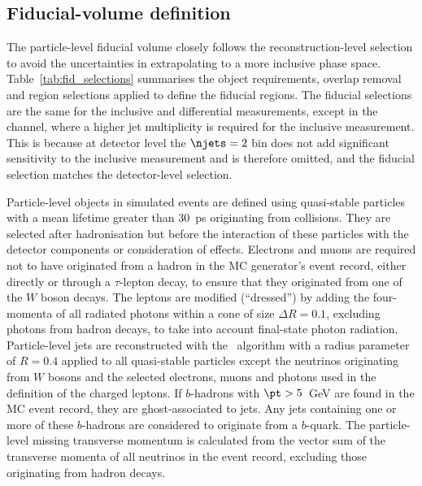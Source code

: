 \documentclass[cernpreprint, atlasdraft=false, texlive=2023, UKenglish, texmf, orcidlogo]{atlasdoc}
\begin{document}
 
 
\subsection{Fiducial-volume definition}
The particle-level fiducial volume closely follows the
reconstruction-level selection to avoid the uncertainties in
extrapolating to a more inclusive phase space. Table~\ref{tab:fid_selections}
summarises the object requirements, overlap removal and region
selections applied to define the fiducial regions. The fiducial selections are
the same for the inclusive and differential \xs measurements, except in the
\llSS channel, where a higher jet multiplicity is required for the inclusive measurement.
This is because at detector level the $\njets=2$ bin does not add
significant sensitivity to the inclusive \xs measurement and is
therefore omitted, and the fiducial selection matches the detector-level selection.
 
Particle-level objects in simulated events are defined using
quasi-stable particles with a mean lifetime greater than 30~ps
originating from \pp collisions. They are selected after
hadronisation but before the interaction of these particles with the
detector components or consideration of \pileup effects.
Electrons and muons are required not to have originated from a hadron in the MC generator's event record, either
directly or through a $\tau$-lepton decay, to ensure that they originated from one of the $W$ boson decays.
The leptons are modified (\enquote{dressed}) by adding the four-momenta of
all radiated photons within a cone of size $\Delta R = 0.1$, excluding
photons from hadron decays, to take into account final-state photon radiation.
Particle-level jets are reconstructed with the \antikt~algorithm with a radius parameter
of $R = 0.4$ applied to all quasi-stable particles except the neutrinos originating from
$W$ bosons and the selected electrons, muons and photons
used in the definition of the charged leptons.
If $b$-hadrons with $\pt > 5$~GeV
are found in the MC event record, they are
ghost-associated to jets. Any jets containing one
or more of these $b$-hadrons are considered to originate from a
$b$-quark. The particle-level missing transverse momentum is
calculated from the vector sum of the transverse momenta of all
neutrinos in the event record, excluding those originating from hadron
decays.
 
 
 
\end{document}
